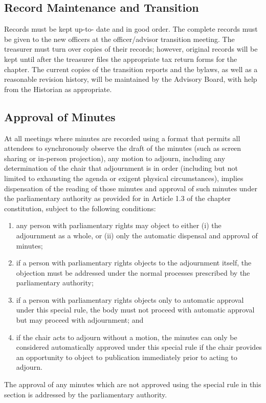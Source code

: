 \subsection{Record Maintenance and Transition} \label{VII.1}

Records must be kept up-to-
date and in good order. The complete records must be given to the new officers at the
officer/advisor transition meeting. The treasurer must turn over copies of their records;
however, original records will be kept until after the treasurer files the appropriate tax
return forms for the chapter. The current copies of the transition reports and the bylaws, as
well as a reasonable revision history, will be maintained by the Advisory Board, with help
from the Historian as appropriate.


\subsection{Approval of Minutes} \label{VII.2}

At all meetings where minutes are recorded
using a format that permits all attendees to synchronously observe the draft of the minutes
(such as screen sharing or in-person projection), any motion to adjourn, including any
determination of the chair that adjournment is in order (including but not limited to exhausting
the agenda or exigent physical circumstances), implies dispensation of the reading
of those minutes and approval of such minutes under the parliamentary authority as
provided for in Article 1.3 of the chapter constitution, subject to the following conditions:
\begin{enumerate}
    \item any person with parliamentary rights may object to either (i) the adjournment as a
whole, or (ii) only the automatic dispensal and approval of minutes;
    \item if a person with parliamentary rights objects to the adjournment itself, the objection
must be addressed under the normal processes prescribed by the parliamentary authority;
    \item if a person with parliamentary rights objects only to automatic approval under this
special rule, the body must not proceed with automatic approval but may proceed
with adjournment; and
    \item if the chair acts to adjourn without a motion, the minutes can only be considered
automatically approved under this special rule if the chair provides an opportunity
to object to publication immediately prior to acting to adjourn.
\end{enumerate}
The approval of any minutes which are not approved using the special rule in this section
is addressed by the parliamentary authority.


